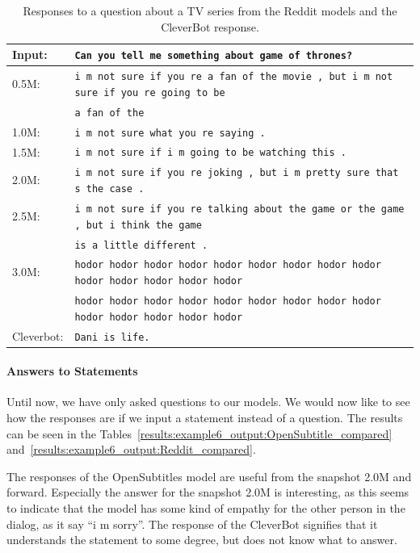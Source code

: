 \begin{table}[H]
	\centering
	\begin{adjustbox}{max width=\textwidth}
		\begin{tabular}{ll}
			\toprule
			Input: 	& \texttt{Can you tell me something about game of thrones?}\\
			\midrule
			0.5M: 	& \texttt{i m not sure if you re a fan of the movie , but i m not sure if you re going to be}\\
			& \texttt{a fan of the}\\
			1.0M: 	& \texttt{i m not sure what you re saying .}\\
			1.5M:	& \texttt{i m not sure if i m going to be watching this .}\\
			2.0M:	& \texttt{i m not sure if you re joking , but i m pretty sure that s the case .}\\
			2.5M:	& \texttt{i m not sure if you re talking about the game or the game , but i think the game}\\
			& \texttt{is a little different .}\\
			3.0M:	& \texttt{hodor hodor hodor hodor hodor hodor hodor hodor hodor hodor hodor hodor hodor hodor }\\
			& \texttt{hodor hodor hodor hodor hodor hodor hodor hodor hodor hodor hodor hodor hodor hodor}\\
			Cleverbot:	& \texttt{Dani is life.}\\
			\bottomrule
		\end{tabular}
	\end{adjustbox}
	\caption{Responses to a question about a TV series from the Reddit models and the CleverBot response.}
	\label{results:example5_output:Reddit_compared}
\end{table}

\paragraph{Answers to Statements}
Until now, we have only asked questions to our models. We would now like to see how the responses are if we input a statement instead of a question. The results can be seen in the Tables~\ref{results:example6_output:OpenSubtitle_compared} and~\ref{results:example6_output:Reddit_compared}.

The responses of the OpenSubtitles model are useful from the snapshot 2.0M and forward. Especially the answer for the snapshot 2.0M is interesting, as this seems to indicate that the model has some kind of empathy for the other person in the dialog, as it say ``i m sorry''. The response of the CleverBot signifies that it understands the statement to some degree, but does not know what to answer.

